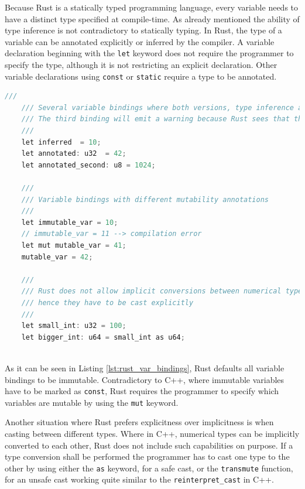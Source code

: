 Because Rust is a statically typed programming language, every variable needs to have a distinct type specified at compile-time. As already mentioned the ability of type inference is not contradictory to statically typing. In Rust, the type of a variable can be annotated explicitly or inferred by the compiler. A variable declaration beginning with the \texttt{let} keyword does not require the programmer to specify the type, although it is not restricting an explicit declaration. Other variable declarations using \texttt{const} or \texttt{static} require a type to be annotated.\\

\begin{lstlisting}[caption={Variable bindings and mutability declarations in Rust}, label={lst:rust_var_bindings}, language=C]
	///
	/// Several variable bindings where both versions, type inference and type annotations, are showcased.
	/// The third binding will emit a warning because Rust sees that the literal exceeds the range of a 'u8'
	///
	let inferred  = 10;
	let annotated: u32 	= 42;
	let annotated_second: u8 = 1024;
	
	///
	/// Variable bindings with different mutability annotations
	///
	let immutable_var = 10;
	// immutable_var = 11 --> compilation error
	let mut mutable_var = 41;
	mutable_var = 42;
	
	///
	/// Rust does not allow implicit conversions between numerical types, 
	/// hence they have to be cast explicitly
	///
	let small_int: u32 = 100;
	let bigger_int: u64 = small_int as u64;
	
\end{lstlisting}

\noindent
As it can be seen in Listing \ref{lst:rust_var_bindings}, Rust defaults all variable bindings to be immutable. Contradictory to C++, where immutable variables have to be marked as \texttt{const}, Rust requires the programmer to specify which variables are mutable by using the \texttt{mut} keyword.

Another situation where Rust prefers explicitness over implicitness is when casting between different types. Where in C++, numerical types can be implicitly converted to each other, Rust does not include such capabilities on purpose. If a type conversion shall be performed the programmer has to cast one type to the other by using either the \texttt{as} keyword, for a safe cast, or the \texttt{transmute} function, for an unsafe cast working quite similar to the \texttt{reinterpret\_cast} in C++.

